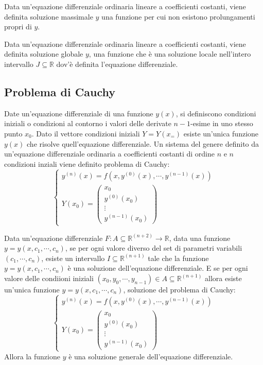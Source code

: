 \documentclass{article}
\numberwithin{equation}{subsection}
\begin{document}
Data un'equazione differenziale ordinaria lineare a coefficienti costanti, viene definita soluzione massimale $y$ una funzione per cui non esistono prolungamenti 
propri di $y$. 

Data un'equazione differenziale ordinaria lineare a coefficienti costanti, viene definita soluzione globale $y$, una funzione che è una soluzione locale 
nell'intero intervallo $J\subseteq\mathbb{R}$ dov'è definita l'equazione differenziale. 

\subsection{Problema di Cauchy}

Date un'equazione differenziale di una funzione $y(x)$, si definiscono condizioni iniziali o condizioni al contorno i valori delle derivate $n-1$-esime in uno stesso punto 
$x_0$. Dato il vettore condizioni iniziali $Y=Y(x_=)$ esiste un'unica funzione $y(x)$ che risolve quell'equazione differenziale. Un sistema del genere 
definito da un'equazione differenziale ordinaria a coefficienti costanti di ordine $n$ e $n$ condizioni inziali viene definito problema di Cauchy:
\begin{equation}
    \begin{cases}
        y^{(n)}(x)=f(x,y^{(0)}(x),\cdots,y^{(n-1)}(x))\\
        Y(x_0)=\begin{pmatrix}
            x_0\\
            y^{(0)}(x_0)\\
            \vdots\\
            y^{(n-1)}(x_0)
        \end{pmatrix}
    \end{cases}
\end{equation}



Data un'equazione differenziale $F:A\subseteq\mathbb{R}^{(n+2)}\to\mathbb{R}$, data una funzione $y=y(x,c_1,\cdots,c_n)$, se per 
ogni valore diverso del set di parametri variabili $(c_1,\cdots,c_n)$, esiste un intervallo $I\subseteq\mathbb{R}^{(n+1)}$ tale che la funzione $y=y(x,c_1,\cdots,c_n)$ è una soluzione 
dell'equazione differenziale. E se per ogni valore delle condiioni iniziali $(x_0,y_0,\cdots,y_{n-1})\in A\subseteq\mathbb{R}^{(n+1)}$ allora esiste un'unica funzione 
$y=y(x,c_1,\cdots,c_n)$, soluzione del problema di Cauchy:
\begin{equation}
    \begin{cases}
        y^{(n)}(x)=f(x,y^{(0)}(x),\cdots,y^{(n-1)}(x))\\
        Y(x_0)=\begin{pmatrix}
            x_0\\
            y^{(0)}(x_0)\\
            \vdots\\
            y^{(n-1)}(x_0)
        \end{pmatrix}
    \end{cases}
\end{equation}
Allora la funzione $y$ è una soluzione generale dell'equazione differenziale. 
\end{document}
